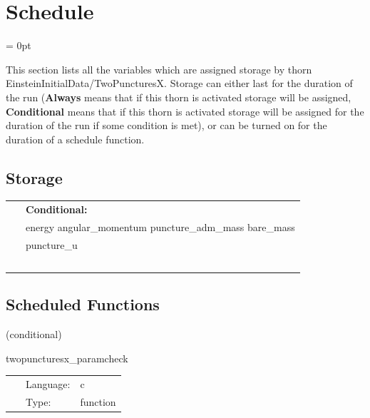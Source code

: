 
\section{Schedule} 


\parskip = 0pt


\noindent This section lists all the variables which are assigned storage by thorn EinsteinInitialData/TwoPuncturesX.  Storage can either last for the duration of the run ({\bf Always} means that if this thorn is activated storage will be assigned, {\bf Conditional} means that if this thorn is activated storage will be assigned for the duration of the run if some condition is met), or can be turned on for the duration of a schedule function.


\subsection*{Storage}

\hspace{5mm}

 \begin{tabular*}{160mm}{ll} 
~& {\bf Conditional:} \\ 
~ &  energy angular\_momentum puncture\_adm\_mass bare\_mass\\ 
~ &  puncture\_u\\ 
~ & ~\\ 
\end{tabular*} 


\subsection*{Scheduled Functions}
\vspace{5mm}

   (conditional) 

\hspace{5mm} twopuncturesx\_paramcheck 

\hspace{5mm}{\it check parameters and thorn needs } 


\hspace{5mm}

 \begin{tabular*}{160mm}{cll} 
~ & Language:  & c \\ 
~ & Type:  & function \\ 
\end{tabular*} 


\vspace{5mm}

